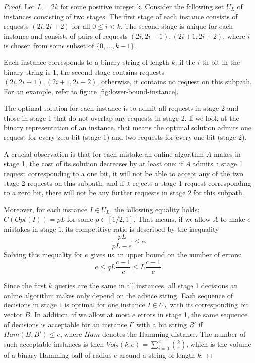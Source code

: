 \begin{proof}
    Let $L = 2k$ for some positive integer k. Consider the following set
    $U_L$ of instances consisting of two stages. The first stage of each
    instance consists of requests $(2i, 2i+2)$ for all $0 \leq i < k$.
    The second stage is unique for each instance and consists of pairs of
    requests $(2i, 2i+1), (2i+1, 2i+2)$, where $i$ is chosen from some
    subset of $\{0, \dots, k-1\}$.

    Each instance corresponds to a binary string of length $k$: if the
    $i$-th bit in the binary string is $1$, the second stage contains
    requests $(2i, 2i+1), (2i+1, 2i+2)$, otherwise, it contains no request
    on this subpath. For an example, refer to figure
    \ref{fig:lower-bound-instance}.

    The optimal solution for each instance is to admit all requests in
    stage 2 and those in stage 1 that do not overlap any requests in
    stage 2. If we look at the binary representation of an instance, that
    means the optimal solution admits one request for every zero bit
    (stage 1) and two requests for every one bit (stage 2).

    A crucial observation is that for each mistake an online algorithm $A$
    makes in stage 1, the cost of its solution decreases by at least one:
    if $A$ admits a stage 1 request corresponding to a one bit, it will
    not be able to accept any of the two stage 2 requests on this subpath,
    and if it rejects a stage 1 request corresponding to a zero bit, there
    will not be any further requests in stage 2 for this subpath.

    Moreover, for each instance $I \in U_L$, the following equality holds:
    $C(Opt(I)) = pL$ for some $p \in [1/2, 1]$. That means, if we allow
    $A$ to make $e$ mistakes in stage $1$, its competitive ratio is
    described by the inequality
    $$
        \frac{pL}{pL-e} \leq c.
    $$
    Solving this inequality for $e$ gives us an upper bound on the number
    of errors:
    \begin{equation}\label{eq:upper-bound-e}
        e \leq qL \frac{c-1}{c} \leq L \frac{c-1}{c}.
    \end{equation}

    Since the first $k$ queries are the same in all instances, all stage 1
    decisions an online algorithm makes only depend on the advice string.
    Each sequence of decisions in stage 1 is optimal for one instance $I
    \in U_L$ with its corresponding bit vector $B$. In addition, if we
    allow at most $e$ errors in stage 1, the same sequence of decisions is
    acceptable for an instance $I'$ with a bit string $B'$ if $Ham(B, B')
    \leq e$, where $Ham$ denotes the Hamming distance. The number of such
    acceptable instances is then $Vol_2(k, e) = \sum_{i=0}^e
    \binom{k}{e}$, which is the volume of a binary Hamming ball of radius
    $e$ around a string of length $k$.


\end{proof}
